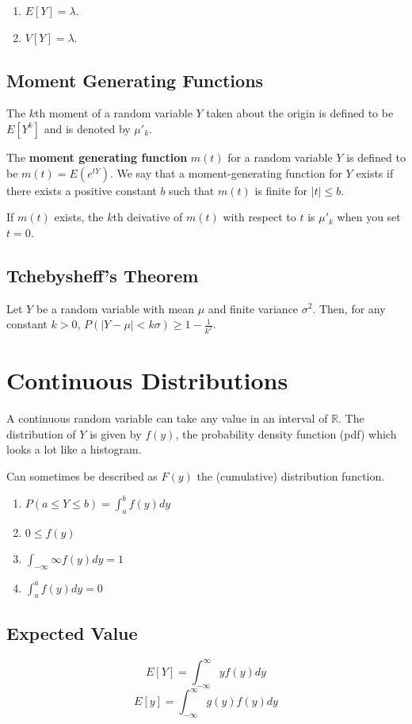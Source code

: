 \documentclass{article}
\begin{document}
\begin{enumerate}
  \item $E[Y]=\lambda$.
  \item $V[Y]=\lambda$.
\end{enumerate}

\subsection{Moment Generating Functions}
The $k$th moment of a random variable $Y$ taken about the origin is defined to
be $E[Y^k]$ and is denoted by $\mu'_k$.

The \textbf{moment generating function} $m(t)$ for a random variable $Y$ is
defined to be $m(t)=E(e^{tY})$. We say that a moment-generating function for
$Y$ exists if there exists a positive constant $b$ such that $m(t)$ is finite
for $|t| \leq b$.

If $m(t)$ exists, the $k$th deivative of $m(t)$ with respect to $t$ is
$\mu'_k$ when you set $t=0$.

\subsection{Tchebysheff's Theorem}
Let $Y$ be a random variable with mean $\mu$ and finite variance $\sigma^2$.
Then, for any constant $k>0$, $P(|Y-\mu|<k\sigma)\geq 1-\frac{1}{k^2}$.

\section{Continuous Distributions}
A continuous random variable can take any value in an interval of $\mathbb{R}$.
The distribution of $Y$ is given by $f(y)$, the probability density function
(pdf) which looks a lot like a histogram.

Can sometimes be described as $F(y)$ the (cumulative) distribution function.

\begin{enumerate}
  \item $P(a \leq Y \leq b) = \int_a^bf(y)dy$
  \item $0 \leq f(y)$
  \item $\int_{-\infty}{\infty} f(y)dy = 1$
  \item $\int_a^a f(y) dy = 0$
\end{enumerate}

\subsection{Expected Value}
\begin{equation}
  E[Y] = \int_{-\infty}^{\infty} y f(y) dy
\end{equation}
\begin{equation}
  E[y] = \int_{-\infty}^{\infty} g(y) f(y) dy
\end{equation}
\end{document}

